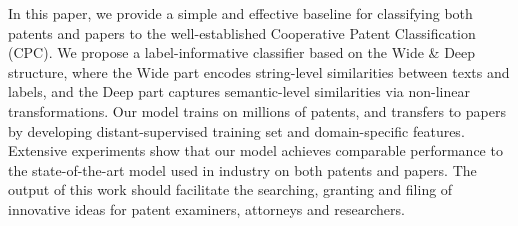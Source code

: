 In this paper, we provide a simple and effective baseline for classifying both patents and papers to the well-established Cooperative Patent Classification (CPC). We propose a label-informative classifier based on the Wide \& Deep structure, where the Wide part encodes string-level similarities between texts and labels,  and the Deep part captures semantic-level similarities via non-linear transformations. Our model trains on millions of patents, and transfers to papers by developing distant-supervised training set and domain-specific features. Extensive experiments show that our model achieves comparable performance to the state-of-the-art model used in industry on both patents and papers.  The output of this work should facilitate the searching, granting and filing of innovative ideas for patent examiners, attorneys and researchers.